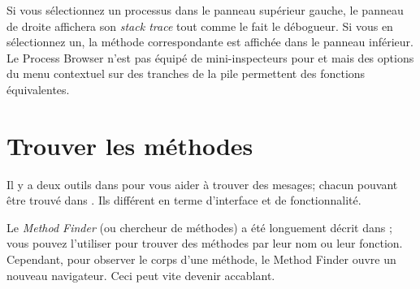 \documentclass[a4paper,10pt,twoside]{book}
\begin{document}
Si vous s\'electionnez un processus dans le panneau sup\'erieur gauche, le panneau de droite
affichera son \emph{stack trace} tout comme le fait le d\'ebogueur.
Si vous en s\'electionnez un, la m\'ethode correspondante est affich\'ee dans le panneau
inf\'erieur.
Le Process Browser n'est pas \'equip\'e de mini-inspecteurs pour 
\self et  mais des options du menu contextuel sur des 
tranches de la pile permettent des fonctions \'equivalentes.



\section{Trouver les m\'ethodes}
\label{sec:methodFinder} 

Il y a deux outils dans \sq pour vous aider \`a trouver des mesages; 
chacun pouvant \^etre trouv\'e dans \toolsflapind.
Ils diff\'erent en terme d'interface et de fonctionnalit\'e.

Le \emph{Method Finder} (ou chercheur de m\'ethodes) a \'et\'e longuement d\'ecrit
dans ; vous pouvez l'utiliser pour trouver des m\'ethodes
par leur nom ou leur fonction.
Cependant, pour observer le corps d'une m\'ethode, le Method Finder ouvre 
un nouveau navigateur.
Ceci peut vite devenir accablant.
\end{document}
